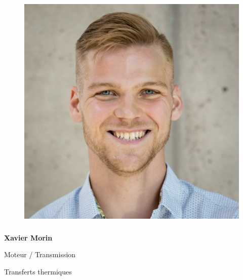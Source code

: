 \documentclass[a0paper,portrait]{baposter}
\begin{document}
\begin{poster}
{\begin{figure}
\includegraphics[width=.9\linewidth]{img/membres/Xavier-Morin-2.jpg} 
\end{figure}
\subsubsection*{}
\vspace{2mm}
\textbf{Xavier Morin}

Moteur / Transmission

Transferts thermiques

\vspace{2mm}
}


\end{poster}
\end{document}
